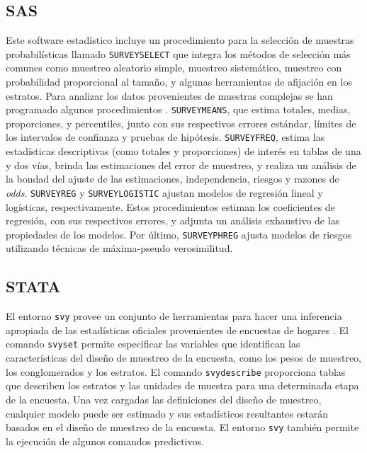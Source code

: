 \documentclass[12pt,spanish,]{book}
\begin{document}
\hypertarget{sas}{%
\subsection*{SAS}\label{sas}}

Este software estadístico incluye un procedimiento para la selección de muestras probabilísticas llamado \texttt{SURVEYSELECT} que integra los métodos de selección más comunes como muestreo aleatorio simple, muestreo sistemático, muestreo con probabilidad proporcional al tamaño, y algunas herramientas de afijación en los estratos. Para analizar los datos provenientes de muestras complejas se han programado algunos procedimientos \autocite{SAS_2017}. \texttt{SURVEYMEANS}, que estima totales, medias, proporciones, y percentiles, junto con sus respectivos errores estándar, límites de los intervalos de confianza y pruebas de hipótesis. \texttt{SURVEYFREQ}, estima las estadísticas descriptivas (como totales y proporciones) de interés en tablas de una y dos vías, brinda las estimaciones del error de muestreo, y realiza un análisis de la bondad del ajuste de las estimaciones, independencia, riesgos y razones de \emph{odds}. \texttt{SURVEYREG} y \texttt{SURVEYLOGISTIC} ajustan modelos de regresión lineal y logísticas, respectivamente. Estos procedimientos estiman los coeficientes de regresión, con sus respectivos errores, y adjunta un análisis exhaustivo de las propiedades de los modelos. Por último, \texttt{SURVEYPHREG} ajusta modelos de riesgos utilizando técnicas de máxima-pseudo verosimilitud.

\hypertarget{stata}{%
\subsection*{STATA}\label{stata}}

El entorno \texttt{svy} provee un conjunto de herramientas para hacer una inferencia apropiada de las estadísticas oficiales provenientes de encuestas de hogares \autocite{STATA_2017}. El comando \texttt{svyset} permite especificar las variables que identifican las características del diseño de muestreo de la encuesta, como los pesos de muestreo, los conglomerados y los estratos. El comando \texttt{svydescribe} proporciona tablas que describen los estratos y las unidades de muestra para una determinada etapa de la encuesta. Una vez cargadas las definiciones del diseño de muestreo, cualquier modelo puede ser estimado y sus estadísticos resultantes estarán basados en el diseño de muestreo de la encuesta. El entorno \texttt{svy} también permite la ejecución de algunos comandos predictivos.
\end{document}
